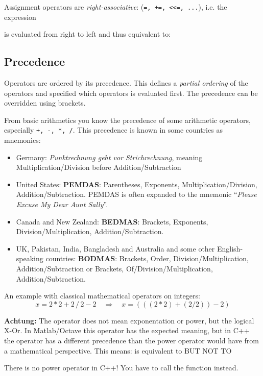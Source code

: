 \begin{example}
  Assignment operators are \emph{right-associative}:  (\texttt{=, +=, <<=, ...}), i.e. the expression

 is evaluated from right to left and thus equivalent to: 
\end{example}

\subsection{Precedence\label{sec:operator-precedence}}
Operators are ordered by its precedence. This defines a \emph{partial ordering} of the operators and specified which operators is evaluated first.
The precedence can be overridden using brackets.

From basic arithmetics you know the precedence of some arithmetic operators, especially \texttt{+, -, *, /}. This precedence is known in some countries as mnemonics:
\begin{itemize}
  \item Germany: \textit{Punktrechnung geht vor Strichrechnung}, meaning Multiplication/Division before Addition/Subtraction
  \item United States: \textbf{PEMDAS}: Parentheses, Exponents, Multiplication/Division, Addition/Subtraction. PEMDAS is often expanded to the mnemonic ``\textit{Please Excuse My Dear Aunt Sally}''.
  \item Canada and New Zealand: \textbf{BEDMAS}: Brackets, Exponents, Division/Multiplication, Addition/Subtraction.
  \item UK, Pakistan, India, Bangladesh and Australia and some other English-speaking countries: \textbf{BODMAS}: Brackets, Order, Division/Multiplication, Addition/Subtraction or Brackets, Of/Division/Multiplication, Addition/Subtraction.
\end{itemize}

\begin{example}
  An example with classical mathematical operators on integers:
\[
x = 2 * 2 + 2\, /\, 2 - 2\quad\Rightarrow\quad x = \left(\left(\left(2 * 2\right) + \left(2 / 2\right)\right) - 2\right)
\]
\end{example}

\begin{rem}
\textbf{Achtung:} The operator \cpp{^} does not mean exponentation or power, but the logical X-Or. In Matlab/Octave this operator has
the expected meaning, but in C++ the operator has a different precedence than the power operator would have from a mathematical perspective.
This means:
is equivalent to
BUT NOT TO

There is no power operator in C++! You have to call the function  instead.
\end{rem}

